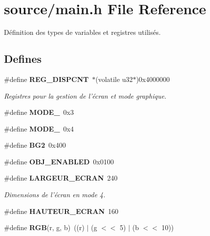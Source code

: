\section{source/main.h File Reference}
\label{main_8h}


Définition des types de variables et registres utilisés.  


\subsection*{Defines}
\begin{DoxyCompactItemize}
\item 
\#define {\bf REG\_\-DISPCNT}~$\ast$(volatile u32$\ast$)0x4000000\label{main_8h_a9a5b1a8377f77fcfde2069c040bcdfdf}

\begin{DoxyCompactList}\small\item\em Registres pour la gestion de l'écran et mode graphique. \item\end{DoxyCompactList}\item 
\#define {\bfseries MODE\_}~0x3\label{main_8h_aeb99b4257cb3cd9fb539529a1bd2d9ca}

\item 
\#define {\bfseries MODE\_}~0x4\label{main_8h_a8b3b716ea0f4eba28a190998b096c063}

\item 
\#define {\bfseries BG2}~0x400\label{main_8h_a9009ae475664cbcf524bf5d7838cb74e}

\item 
\#define {\bfseries OBJ\_\-ENABLED}~0x0100\label{main_8h_a4d80d632fd6246b31023c1265cbb3cb6}

\item 
\#define {\bf LARGEUR\_\-ECRAN}~240\label{main_8h_a586a4c30ccbcbe94b7776a73d0c6fe18}

\begin{DoxyCompactList}\small\item\em Dimensions de l'écran en mode 4. \item\end{DoxyCompactList}\item 
\#define {\bfseries HAUTEUR\_\-ECRAN}~160\label{main_8h_ad86253328fbbbd6eb266efdd6bd2ef09}

\item 
\#define {\bf RGB}(r, g, b)~((r) $|$ (g $<$$<$ 5) $|$ (b $<$$<$ 10))\label{main_8h_a4a118ad3ee36468a3fa616977a64864e}


\end{DoxyCompactItemize}
